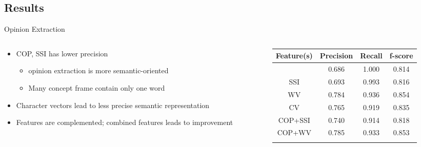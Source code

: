 \documentclass[compress]{beamer}
\begin{document}
    \subsection{Results}
        \begin{frame}{Opinion Extraction}
            \begin{columns}
                \begin{column}[T]{.5\textwidth}
                    \begin{itemize}
                        \item<1-> COP, SSI has lower precision
                            \begin{itemize}
                                \item opinion extraction  is more semantic-oriented
                                \item Many concept frame contain only one word
                            \end{itemize}
                        \item<2-> Character vectors lead to less precise semantic representation
                        \item<3-> Features are complemented; combined features leads to improvement
                    \end{itemize}
                \end{column}
                \begin{column}[T]{.6\textwidth}
                    \begin{table}
                    \small
                    \centering
                    \tabcolsep=0.1cm
                    \begin{tabular}{cccc}
                    \hline
                    Feature(s) & Precision & Recall & f-score \\ \hline
                    \only<1>{
                        COP        & \cellcolor{green}0.686     & 1.000  & 0.814   \\ \hline
                        SSI        & \cellcolor{green}0.693     & 0.993  & 0.816   \\ \hline
                        WV         & 0.784     & 0.936  & 0.854   \\ \hline
                        CV         & 0.765     & 0.919  & 0.835   \\ \hline
                        COP+SSI    & 0.740     & 0.914  & 0.818   \\ \hline
                        COP+WV     & 0.785     & 0.933  & 0.853   \\ \hline
}
\end{tabular}
\end{table}
\end{column}
\end{columns}
\end{frame}
\end{document}
